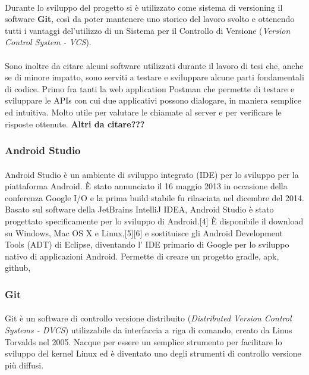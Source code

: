 \paragraph{}
Durante lo sviluppo del progetto si è utilizzato come sistema di versioning il software \textbf{Git}, così da poter mantenere uno storico del lavoro svolto e ottenendo tutti i vantaggi del'utilizzo di un Sistema per il Controllo di Versione (\textit{Version Control System - VCS}).

\paragraph{}
Sono inoltre da citare alcuni software utilizzati durante il lavoro di tesi che, anche se di minore impatto, sono serviti a testare e sviluppare alcune parti fondamentali di codice.
Primo fra tanti la web application Postman \autocite{POSTMAN} che permette di testare e sviluppare le APIs con cui due applicativi possono dialogare, in maniera semplice ed intuitiva. Molto utile per valutare le chiamate al server e per verificare le risposte ottenute.
\textbf{Altri da citare???}

\subsubsection{Android Studio}
\paragraph{}

Android Studio \autocite{WIKIPEDIA:ANDROIDSTUDIO} è un ambiente di sviluppo integrato (IDE) per lo sviluppo per la piattaforma Android. È stato annunciato il 16 maggio 2013 in occasione della conferenza Google I/O e la prima build stabile fu rilasciata nel dicembre del 2014.
Basato sul software della JetBrains IntelliJ IDEA, Android Studio è stato progettato specificamente per lo sviluppo di Android.[4] È disponibile il download su Windows, Mac OS X e Linux,[5][6] e sostituisce gli Android Development Tools (ADT) di Eclipse, diventando l' IDE primario di Google per lo sviluppo nativo di applicazioni Android.
Permette di creare un progetto gradle, apk, github, 


\subsubsection{Git}
\paragraph{}
Git è un software di controllo versione distribuito (\textit{Distributed Version Control Systems - DVCS}) utilizzabile da interfaccia a riga di comando, creato da Linus Torvalds nel 2005. \autocite{WIKIPEDIA:GIT}
Nacque per essere un semplice strumento per facilitare lo sviluppo del kernel Linux ed è diventato uno degli strumenti di controllo versione più diffusi.

